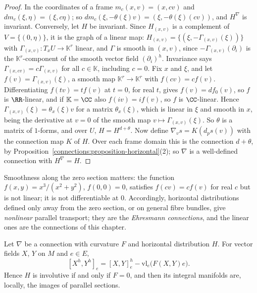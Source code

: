 \begin{proof}
In the coordinates of a frame $m_c(x, v) = (x, cv)$ and $dm_c(\xi, \eta) = (\xi, c\eta)$; so $dm_c(\xi, -\theta(\xi)v) = (\xi, -\theta(\xi)(cv))$, and $H^\nabla$ is invariant. Conversely, let $H$
be invariant. Since $H_{(x, v)}$ is a complement of $V = \{(0, \eta)\}$, it is the graph of a linear map: $H_{(x, v)} = \{(\xi, -\Gamma_{(x, v)}(\xi))\}$ with
$\Gamma_{(x, v)} \colon T_xU \to \mathbb{K}^r$ linear, and $\Gamma$ is smooth in $(x, v)$, since $-\Gamma_{(x, v)}(\partial_i)$ is the $\mathbb{K}^r$-component of the smooth vector field
$(\partial_i)^h$. Invariance says $\Gamma_{(x, cv)} = c\Gamma_{(x, v)}$ for all $c \in \mathbb{K}$, including $c = 0$. Fix $x$ and $\xi$, and let $f(v) = \Gamma_{(x, v)}(\xi)$, a smooth map
$\mathbb{K}^r \to \mathbb{K}^r$ with $f(cv) = cf(v)$. Differentiating $f(tv) = tf(v)$ at $t = 0$, for real $t$, gives $f(v) = df_0(v)$, so $f$ is $\RR$-linear, and if $\mathbb{K} = \CC$ also
$f(iv) = if(v)$, so $f$ is $\CC$-linear. Hence $\Gamma_{(x, v)}(\xi) = \theta_x(\xi)v$ for a matrix $\theta_x(\xi)$, which is linear in $\xi$ and smooth in $x$, being the derivative at $v = 0$
of the smooth map $v \mapsto \Gamma_{(x, v)}(\xi)$. So $\theta$ is a matrix of $1$-forms, and over $U$, $H = H^{d + \theta}$. Now define $\nabla_vs = K(d_ps(v))$ with the connection map $K$ of
$H$. Over each frame domain this is the connection $d + \theta$, by Proposition~\ref{connections:proposition-horizontal}(2); so $\nabla$ is a well-defined connection with $H^\nabla = H$.
\end{proof}

Smoothness along the zero section matters: the function $f(x, y) = x^3/(x^2 + y^2)$, $f(0, 0) = 0$, satisfies $f(cv) = cf(v)$ for real $c$ but is not linear; it is not differentiable at
$0$. Accordingly, horizontal distributions defined only away from the zero section, or on general fibre bundles, give \emph{nonlinear} parallel transport; they are the \emph{Ehresmann
connections}, and the linear ones are the connections of this chapter.

\begin{proposition}\label{connections:proposition-horizontal-curvature}
Let $\nabla$ be a connection with curvature $F$ and horizontal distribution $H$. For vector fields $X$, $Y$ on $M$ and $e \in E$,
\[
[X^h, Y^h]_e = [X, Y]^h_e - \mathrm{vl}_e\bigl(F(X, Y)e\bigr).
\]
Hence $H$ is involutive if and only if $F = 0$, and then its integral manifolds are, locally, the images of parallel sections.
\end{proposition}

